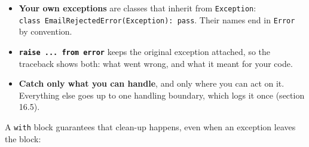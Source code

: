 \label{44-appendices:g7-exceptions}

\begin{codebox}[short]

\begin{Shaded}
\begin{Highlighting}[]
\NormalTok{:}
\OperatorTok{=}\OperatorTok{=}\OperatorTok{=}\NormalTok{(}\NormalTok{, }\NormalTok{))}
    \NormalTok{) }
\NormalTok{:}
\NormalTok{:}
\end{Highlighting}
\end{Shaded}

\end{codebox}

\begin{itemize}
\tightlist
\item
  \textbf{Your own exceptions} are classes that inherit from \texttt{Exception}: \texttt{class\ EmailRejectedError(Exception):}\allowbreak{}\texttt{\ pass}. Their names end in \texttt{Error} by convention.
\item
  \textbf{\texttt{raise\ ...\ from\ error}} keeps the original exception attached, so the traceback shows both: what went wrong, and what it meant for your code.
\item
  \textbf{Catch only what you can handle}, and only where you can act on it. Everything else goes up to one handling boundary, which logs it once (section 16.5).
\end{itemize}

\label{44-appendices:g8-context-managers-with}

A \texttt{with} block guarantees that clean-up happens, even when an exception leaves the block:

